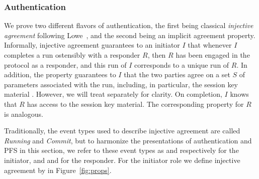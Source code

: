\subsubsection{Authentication}
\label{sec:authenticationDef}
We prove two different flavors of authentication, the first being classical
\emph{injective agreement} following Lowe~\cite{DBLP:conf/csfw/Lowe97a}, and
the second being an implicit agreement property.
%
Informally, injective agreement guarantees to an initiator $I$ that whenever
$I$ completes a run ostensibly with a responder $R$,
then $R$ has been engaged in the protocol as a responder,
and this run of $I$ corresponds to a unique run of $R$.
%
In addition, the property guarantees to $I$ that the two parties agree on a set
$S$ of parameters associated with the run, including, in particular, the
session key material \mSessKey{}.
%
However, we will treat \mSessKey{} separately for clarity.
%
On completion, $I$ knows that $R$ has access to the session key material.
%
The corresponding property for $R$ is analogous.
%

Traditionally, the event types used to describe injective agreement are called
\emph{Running} and \emph{Commit}, but to harmonize the presentations of
authentication and PFS in this section, we refer to these event types as
\mIStart{} and \mIComplete{} respectively for the initiator, and
\mRStart{} and \mRComplete{} for the responder.
%
For the initiator role we define injective agreement by
\mPredInjI{} in Figure~\ref{fig:props}.

